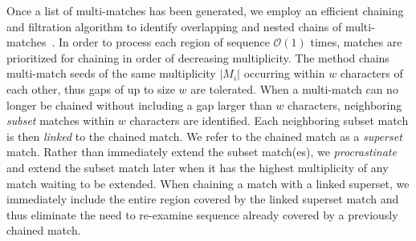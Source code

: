 \documentclass[9.5pt,journal,final,finalsubmission,twocolumn]{IEEEtran}
\begin{document}
Once a list of multi-matches has been generated, we employ an
efficient chaining and filtration algorithm to identify overlapping
and nested chains of multi-matches~\cite{ref-procrast}. In order to
process each region of sequence $\mathcal{O}(1)$ times, matches
are prioritized for chaining in order of decreasing multiplicity.  The
method chains multi-match seeds of the same multiplicity $|M_i|$
occurring within $w$ characters of each other, thus gaps of up to size
$w$ are tolerated.  When a multi-match can
no longer be chained without including a gap larger than $w$
characters, neighboring \textit{subset} matches within $w$ characters
are identified. Each neighboring subset match is then \textit{linked}
to the chained match. We refer to the chained match as a
\textit{superset} match. Rather than immediately extend the subset
match(es), we \textit{procrastinate} and extend the subset match later
when it has the highest multiplicity of any match waiting to be
extended. When chaining a match with a linked superset, we immediately
include the entire region covered by the linked superset match and
thus eliminate the need to re-examine sequence already covered by a
previously chained match.
\end{document}
